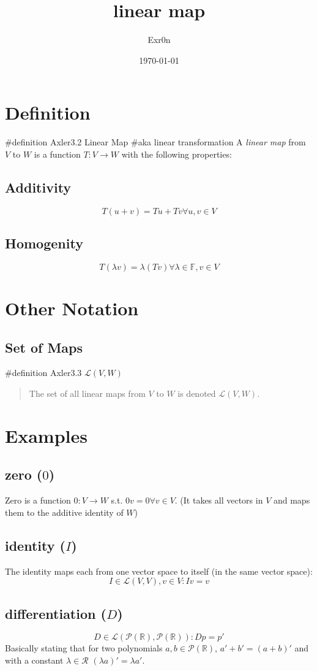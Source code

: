 \documentclass[letterpaper]{article}
\author{Exr0n}
\date{\today}
\title{linear map}
\renewcommand{\tableofcontents}{}
\begin{document}
\tableofcontents


\section{Definition}
\label{sec:org472167d}
\#definition Axler3.2 Linear Map
\#aka linear transformation
A \emph{linear map} from \(V\) to \(W\) is a function \(T : V \to W\) with the following properties:
\subsection{Additivity}
\label{sec:org539df96}
$$T(u+v) = Tu + Tv \forall u, v \in V$$
\subsection{Homogenity}
\label{sec:orgf3a89c4}
$$T(\lambda v) = \lambda(T v) \forall \lambda \in \mathbb{F}, v\in V$$
\section{Other Notation}
\label{sec:org4f09307}
\subsection{Set of Maps}
\label{sec:org2714ded}
\#definition Axler3.3 \(\mathcal{L}(V, W)\)
\begin{quote}
The set of all linear maps from \(V\) to \(W\) is denoted \(\mathcal{L}(V, W)\).
\end{quote}
\section{Examples}
\label{sec:org3c18571}
\subsection{zero (\(0\))}
\label{sec:org2353896}
Zero is a function \(0 : V \to W\) s.t. \(0v = 0 \forall v \in V\). (It takes all vectors in \(V\) and maps them to the additive identity of \(W\))
\subsection{identity (\(I\))}
\label{sec:orge15fa34}
The identity maps each from one vector space to itself (in the same vector space):
$$I \in \mathcal{L}(V, V), v\in V : Iv = v$$
\subsection{differentiation (\(D\))}
\label{sec:org34bfe05}
$$D \in \mathcal{L}\left(\mathcal{P}(\mathbb{R}), \mathcal{P}(\mathbb{R})\right) : Dp = p'$$
Basically stating that for two polynomials \(a, b \in \mathcal{P}(\mathbb{R})\), \(a'+b' = (a+b)'\) and with a constant \(\lambda \in \mathcal{R}\) \((\lambda a)' = \lambda a'\).
\end{document}
